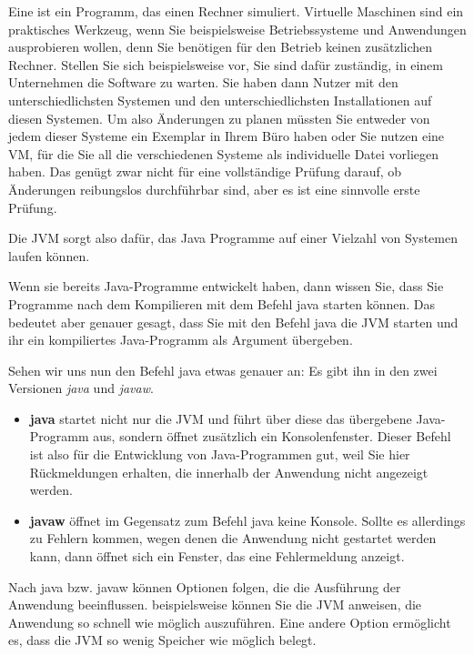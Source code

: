 Eine  ist ein Programm, das einen Rechner simuliert. Virtuelle Maschinen sind ein praktisches Werkzeug, wenn Sie beispielsweise Betriebssysteme und Anwendungen ausprobieren wollen, denn Sie benötigen für den Betrieb keinen zusätzlichen Rechner. Stellen Sie sich beispielsweise vor, Sie sind dafür zuständig, in einem Unternehmen die Software zu warten. Sie haben dann Nutzer mit den unterschiedlichsten Systemen und den unterschiedlichsten Installationen auf diesen Systemen. Um also Änderungen zu planen müssten Sie entweder von jedem dieser Systeme ein Exemplar in Ihrem Büro haben oder Sie nutzen eine VM, für die Sie all die verschiedenen Systeme als individuelle Datei vorliegen haben. Das genügt zwar nicht für eine vollständige Prüfung darauf, ob Änderungen reibungslos durchführbar sind, aber es ist eine sinnvolle erste Prüfung.

Die JVM sorgt also dafür, das Java Programme auf einer Vielzahl von Systemen laufen können.

Wenn sie bereits Java-Programme entwickelt haben, dann wissen Sie, dass Sie Programme nach dem Kompilieren mit dem Befehl java starten können. Das bedeutet aber genauer gesagt, dass Sie mit den Befehl java die JVM starten und ihr ein kompiliertes Java-Programm als Argument übergeben.

Sehen wir uns nun den Befehl java etwas genauer an: Es gibt ihn in den zwei Versionen \emph{java} und \emph{javaw}.

\begin{itemize}
	
	\item \textbf{java} startet nicht nur die JVM und führt über diese das übergebene Java-Programm aus, sondern öffnet zusätzlich ein Konsolenfenster. Dieser Befehl ist also für die Entwicklung von Java-Programmen gut, weil Sie hier Rückmeldungen erhalten, die innerhalb der Anwendung nicht angezeigt werden.
	
	\item \textbf{javaw} öffnet im Gegensatz zum Befehl java keine Konsole. Sollte es allerdings zu Fehlern kommen, wegen denen die Anwendung nicht gestartet werden kann, dann öffnet sich ein Fenster, das eine Fehlermeldung anzeigt.
	
\end{itemize}

Nach java bzw. javaw können Optionen folgen, die die Ausführung der Anwendung beeinflussen. beispielsweise können Sie die JVM anweisen, die Anwendung so schnell wie möglich auszuführen. Eine andere Option ermöglicht es, dass die JVM so wenig Speicher wie möglich belegt.

